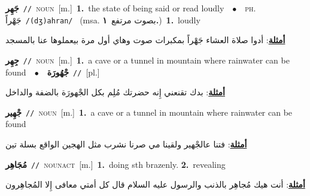 \documentclass[10pt,a4paper,twoside]{article} %
\begin{document}
\begin{multicols}{2}
{\setlength\topsep{0pt}\textbf{\foreignlanguage{arabic}{جَهِر}}\ {\color{gray}\texttt{//}\color{black}}\ \textsc{noun}\ [m.]\ \textbf{1.}~the state of being said or read loudly\ \ $\bullet$\ \ \textsc{ph.} \color{gray} \foreignlanguage{arabic}{جَهْراً}\color{black}\ {\color{gray}\texttt{/{\sffamily (dʒ)ahran}/}\color{black}}\ \color{gray} (msa. \foreignlanguage{arabic}{بصوت مرتفع}~\foreignlanguage{arabic}{\textbf{١.}})\color{black}\ \textbf{1.}~loudly\  \begin{flushright}\color{gray}\foreignlanguage{arabic}{\textbf{\underline{\foreignlanguage{arabic}{أمثلة}}}: أدوا صلاة العشاء جَهْراً بمكبرات صوت وهاي أول مرة بيعملوها عنا بالمسجد}\end{flushright}\color{black}} \vspace{2mm}

{\setlength\topsep{0pt}\textbf{\foreignlanguage{arabic}{جِهِر}}\ {\color{gray}\texttt{//}\color{black}}\ \textsc{noun}\ [m.]\ \textbf{1.}~a cave or a tunnel in mountain where rainwater can be found\ \ $\bullet$\ \ \setlength\topsep{0pt}\textbf{\foreignlanguage{arabic}{جْهُورَة}}\ {\color{gray}\texttt{//}\color{black}}\ [pl.]\  \begin{flushright}\color{gray}\foreignlanguage{arabic}{\textbf{\underline{\foreignlanguage{arabic}{أمثلة}}}: بدك تقنعني إِنه حضرتك مُلِم بكل الجْهورَة بالضفة والداخل}\end{flushright}\color{black}} \vspace{2mm}

{\setlength\topsep{0pt}\textbf{\foreignlanguage{arabic}{جْهِير}}\ {\color{gray}\texttt{//}\color{black}}\ \textsc{noun}\ [m.]\ \textbf{1.}~a cave or a tunnel in mountain where rainwater can be found\  \begin{flushright}\color{gray}\foreignlanguage{arabic}{\textbf{\underline{\foreignlanguage{arabic}{أمثلة}}}: فتنا عالجْهير ولقينا مي صرنا نشرب مثل الهجين الواقع بسلة تين}\end{flushright}\color{black}} \vspace{2mm}

{\setlength\topsep{0pt}\textbf{\foreignlanguage{arabic}{مُجَاهِر}}\ {\color{gray}\texttt{//}\color{black}}\ \textsc{noun\textunderscore act}\ [m.]\ \textbf{1.}~doing sth brazenly.  \textbf{2.}~revealing\  \begin{flushright}\color{gray}\foreignlanguage{arabic}{\textbf{\underline{\foreignlanguage{arabic}{أمثلة}}}: أنت هيك مُجاهِر بالذنب والرسول عليه السلام قال كل أمتي معافى إِلا المُجاهِرون}\end{flushright}\color{black}} \vspace{2mm}


\end{multicols}
\end{document}
